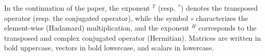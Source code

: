     \noindent
    In the continuation of the paper, the exponent $^T$ (resp. $^*$) denotes the transposed operator (resp. the conjugated operator), while the symbol $\circ$ characterizes the element-wise (Hadamard) multiplication, and the exponent $^H$ corresponds to the transposed and complex conjugated operator (Hermitian). Matrices are written in bold uppercase, vectors in bold lowercase, and scalars in lowercase.%
    
